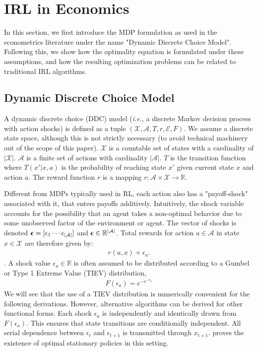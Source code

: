 \documentclass{article}
\renewcommand{\vec}[1]{\mbox{\bm{$#1$}}}
\begin{document}
\section{IRL in Economics}

In this section, we first introduce the MDP formulation as used in the econometrics literature under the name "Dynamic Discrete Choice Model". Following this, we show how the optimality equation is formulated under these assumptions, and how the resulting optimization problems can be related to traditional IRL algorithms.

\subsection{Dynamic Discrete Choice Model}

A dynamic discrete choice (DDC) model (\emph{i.e.}, a discrete Markov decision process with action shocks) is defined as a tuple $(\mathcal{X,A}, T,r,\mathcal{E},F)$. 
We assume a discrete state space, although this is not strictly necessary (to avoid technical machinery out of the scope of this paper).
$\mathcal{X}$ is a countable set of states with a cardinality of $|\mathcal{X}|$. $\mathcal{A}$ is a finite set of actions with cardinality $|\mathcal{A}|$. $T$ is the transition function where $T(x'|x,a)$ is the probability of reaching state $x'$ given current state $x$ and action $a$. The reward function $r$ is a mapping $r:\mathcal{A}\times\mathcal{X}\rightarrow \mathbb{R}$.

Different from MDPs typically used in RL, each action also has a "payoff-shock" associated with it, that enters payoffs additively.
Intuitively, the shock variable accounts for the possibility that an agent takes a non-optimal behavior due to some unobserved factor of the environment or agent.
The vector of shocks is denoted $\vec{\epsilon} = [ \epsilon_{1} \cdots \epsilon_{|\mathcal{A}|} ]$ and $\vec{\epsilon}\in \mathbb{R}^{|\mathcal{A}|}$. Total rewards for action $a \in \mathcal{A}$ in state $x \in \mathcal{X}$ are therefore given by:
\begin{eqnarray}
r(a,x)+\epsilon_a.
\end{eqnarray}
. A shock value $\epsilon_a\in\mathbb{R}$ is often assumed to be distributed according to a Gumbel or Type 1 Extreme Value (TIEV) distribution,
\begin{align}
F(\epsilon_a)=e^{-e^{-\epsilon_a}}
\end{align}
We will see that the use of a TIEV distribution is numerically convenient for the following derivations. However, alternative algorithms can be derived for other functional forms. Each shock $\epsilon_a$ is independently and identically drawn from $F(\epsilon_a)$. This ensures that state transitions are conditionally independent. All serial dependence between $\epsilon_{t}$ and $\epsilon_{t+1}$ is transmitted through $x_{t+1}$. \cite{rust_theory} proves the existence of optimal stationary policies in this setting.
\end{document}
